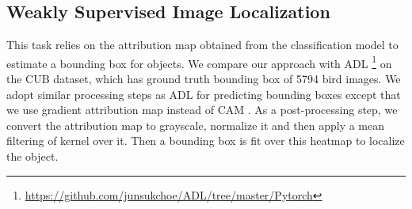 \documentclass[runningheads]{llncs}
\begin{document}
\begin{table}[t]
\caption{\footnotesize{Weakly Supervised Localization on CUB dataset. Bold text refers to the best GT-Known Loc and Top-1 Loc for each model architecture.  denotes directly reported from the paper.  denotes our implementation of ADL from the official code released by \cite{adl} }}
\label{table:weakloc}
\centering
{}
\end{table}

\subsection{Weakly Supervised Image Localization}\label{sec:wsol}
This task relies on the attribution map obtained from the classification model to estimate a bounding box for objects. We compare our approach with ADL \cite{adl}\footnote{\url{https://github.com/junsukchoe/ADL/tree/master/Pytorch}} on the CUB dataset, which has ground truth bounding box of 5794 bird images. We adopt similar processing steps as ADL for predicting bounding boxes except that we use gradient attribution map  instead of CAM \cite{attr2016cam}. As a post-processing step, we convert the attribution map to grayscale, normalize it and then apply a mean filtering of  kernel over it. Then a bounding box is fit over this heatmap to localize the object.
\end{document}
